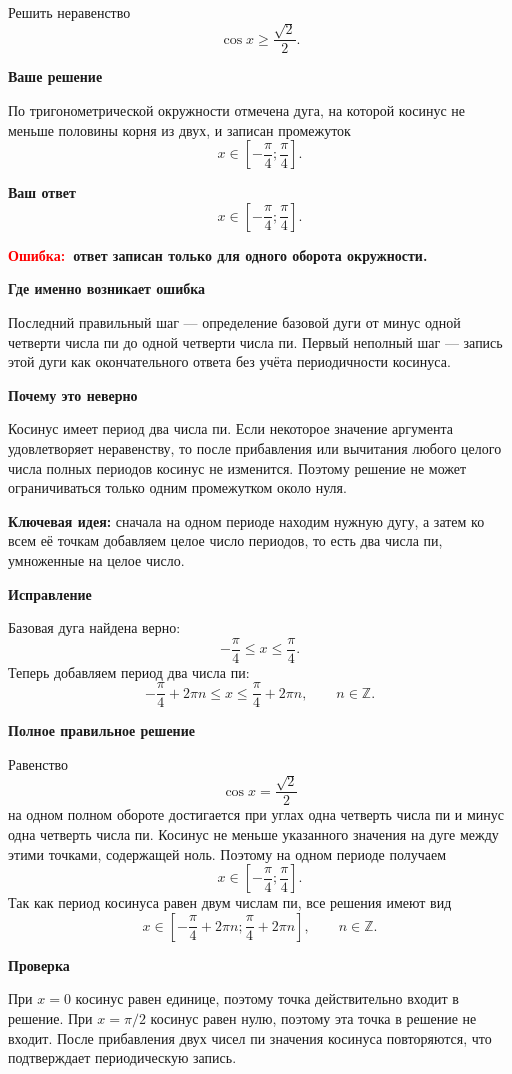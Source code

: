 \documentclass[12pt,a4paper]{article}
\newcommand{\err}{\textcolor{red}{Ошибка:}}
\newcommand{\idea}{\textcolor{blue!60!black}{Ключевая идея:}}
\begin{document}
Решить неравенство
\[
\cos x\ge \frac{\sqrt2}{2}.
\]

\textbf{Ваше решение}

По тригонометрической окружности отмечена дуга, на которой косинус не меньше половины корня из двух, и записан промежуток
\[
x\in\left[-\frac\pi4;\frac\pi4\right].
\]

\textbf{Ваш ответ}
\[
x\in\left[-\frac\pi4;\frac\pi4\right].
\]

\textbf{\err\ ответ записан только для одного оборота окружности.}

\textbf{Где именно возникает ошибка}

Последний правильный шаг --- определение базовой дуги от минус одной четверти числа пи до одной четверти числа пи. Первый неполный шаг --- запись этой дуги как окончательного ответа без учёта периодичности косинуса.

\textbf{Почему это неверно}

Косинус имеет период два числа пи. Если некоторое значение аргумента удовлетворяет неравенству, то после прибавления или вычитания любого целого числа полных периодов косинус не изменится. Поэтому решение не может ограничиваться только одним промежутком около нуля.

\textbf{\idea} сначала на одном периоде находим нужную дугу, а затем ко всем её точкам добавляем целое число периодов, то есть два числа пи, умноженные на целое число.

\textbf{Исправление}

Базовая дуга найдена верно:
\[
-\frac\pi4\le x\le \frac\pi4.
\]
Теперь добавляем период два числа пи:
\[
-\frac\pi4+2\pi n\le x\le \frac\pi4+2\pi n,
\qquad n\in\mathbb Z.
\]

\textbf{Полное правильное решение}

Равенство
\[
\cos x=\frac{\sqrt2}{2}
\]
на одном полном обороте достигается при углах одна четверть числа пи и минус одна четверть числа пи. Косинус не меньше указанного значения на дуге между этими точками, содержащей ноль. Поэтому на одном периоде получаем
\[
x\in\left[-\frac\pi4;\frac\pi4\right].
\]
Так как период косинуса равен двум числам пи, все решения имеют вид
\[
x\in\left[-\frac\pi4+2\pi n;\frac\pi4+2\pi n\right],
\qquad n\in\mathbb Z.
\]

\textbf{Проверка}

При $x=0$ косинус равен единице, поэтому точка действительно входит в решение. При $x=\pi/2$ косинус равен нулю, поэтому эта точка в решение не входит. После прибавления двух чисел пи значения косинуса повторяются, что подтверждает периодическую запись.
\end{document}
